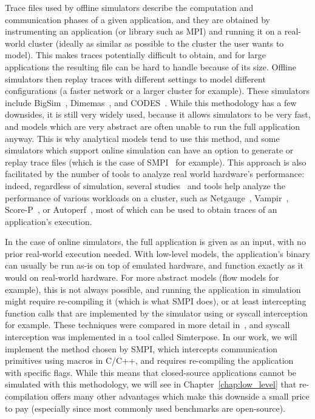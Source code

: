 Trace files used by offline simulators describe the computation and
communication phases of a given application, and they are obtained by
instrumenting an application (or library such as MPI) and running it on a
real-world cluster (ideally as similar as possible to the cluster the user wants
to model). This makes traces potentially difficult to obtain, and for large
applications the resulting file can be hard to handle because of its size.
Offline simulators then replay traces with different settings to model different
configurations (a faster network or a larger cluster for example). These
simulators include BigSim~\cite{Zheng2004}, Dimemas~\cite{Girona2000}, and
CODES~\cite{Cope2011}. While this methodology has a few downsides, it is still
very widely used, because it allows simulators to be very fast, and models which
are very abstract are often unable to run the full application anyway. This is
why analytical models tend to use this method, and some simulators which support
online simulation can have an option to generate or replay trace files (which is
the case of SMPI~\cite{Degomme2017a} for example). This approach is also
facilitated by the number of tools to analyze real world hardware's performance:
indeed, regardless of simulation, several studies~\cite{Jyothi2017} and tools
help analyze the performance of various workloads on a cluster, such as
Netgauge~\cite{Hoefler2007a}, Vampir~\cite{Knupfer2008},
Score-P~\cite{Knupfer2012}, or Autoperf~\cite{Chunduri2019}, most of which can
be used to obtain traces of an application's execution.

In the case of online simulators, the full application is given as an input,
with no prior real-world execution needed. With low-level models, the
application's binary can usually be run as-is on top of emulated hardware, and
function exactly as it would on real-world hardware. For more abstract models
(flow models for example), this is not always possible, and running the
application in simulation might require re-compiling it (which is what SMPI
does), or at least intercepting function calls that are implemented by the
simulator using  or syscall interception for example. These
techniques were compared in more detail in~\cite{Bessad2015}, and syscall
interception was implemented in a tool called Simterpose. In our work, we will
implement the method chosen by SMPI, which intercepts communication primitives
using  macros in C/C++, and requires re-compiling the
application with specific flags. While this means that closed-source
applications cannot be simulated with this methodology, we will see in
Chapter~\ref{chap:low_level} that re-compilation offers many other advantages
which make this downside a small price to pay (especially since most commonly
used benchmarks are open-source).


